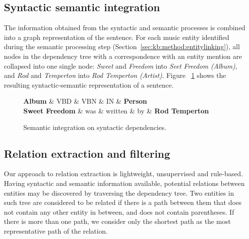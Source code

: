 \subsection{Syntactic semantic integration}
\label{sec:kb:method:syntsemint}

The information obtained from the syntactic and semantic processes is combined into a graph representation of the sentence. For each music entity identified during the semantic processing step (Section~\ref{sec:kb:method:entitylinking}), all nodes in the dependency tree with a correspondence with an entity mention are collapsed into one single node: \textit{Sweet} and \textit{Freedom} into \textit{Seet Freedom (Album)}, and \textit{Rod} and \textit{Temperton} into \textit{Rod Temperton (Artist)}. Figure ~\ref{fig:kb:sampletree_combined} shows the resulting syntactic-semantic representation of a sentence.

\begin{figure}[!htb]
\centering
\begin{dependency}
\begin{deptext}[column sep=.0cm]
\textbf{Album} \& VBD \& VBN \& IN \& \textbf{Person} \\
\textbf{Sweet Freedom} \& was \& written \& by \& \textbf{Rod Temperton} \\
\end{deptext}



\end{dependency}
\vspace*{-5mm}
\caption{Semantic integration on syntactic dependencies.}
\label{fig:kb:sampletree_combined}
\end{figure}


\subsection{Relation extraction and filtering}
\label{sec:kb:method:re-filtering}

Our approach to relation extraction is lightweight, unsupervised and rule-based. Having syntactic and semantic information available, potential relations between entities may be discovered by traversing the dependency tree.
Two entities in such tree are considered to be related if there is a path between them that does not contain any other entity in between, and does not contain parentheses. If there is more than one path, we consider only the shortest path as the most representative path of the relation.

